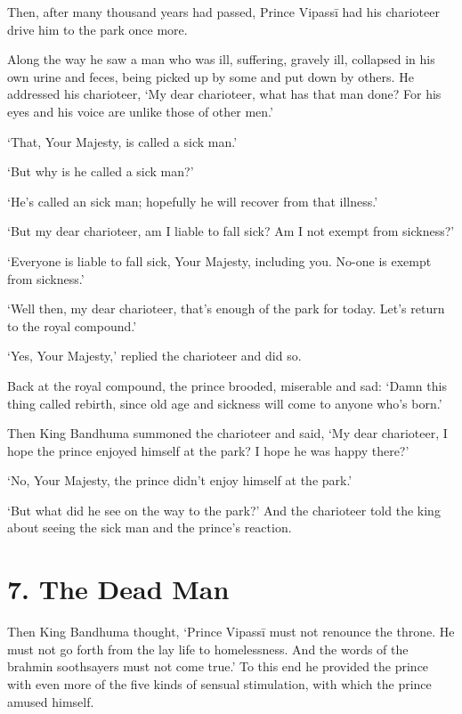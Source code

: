 \documentclass[12pt,openany]{book}%
\begin{document}
Then, after many thousand years had passed, Prince \textsanskrit{Vipassī} had his charioteer drive him to the park once more. 

Along the way he saw a man who was ill, suffering, gravely ill, collapsed in his own urine and feces, being picked up by some and put down by others. He addressed his charioteer, ‘My dear charioteer, what has that man done? For his eyes and his voice are unlike those of other men.’ 

‘That, Your Majesty, is called a sick man.’ 

‘But why is he called a sick man?’ 

‘He’s called an sick man; hopefully he will recover from that illness.’ 

‘But my dear charioteer, am I liable to fall sick? Am I not exempt from sickness?’ 

‘Everyone is liable to fall sick, Your Majesty, including you. No-one is exempt from sickness.’ 

‘Well then, my dear charioteer, that’s enough of the park for today. Let’s return to the royal compound.’ 

‘Yes, Your Majesty,’ replied the charioteer and did so. 

Back at the royal compound, the prince brooded, miserable and sad: ‘Damn this thing called rebirth, since old age and sickness will come to anyone who’s born.’ 

Then King Bandhuma summoned the charioteer and said, ‘My dear charioteer, I hope the prince enjoyed himself at the park? I hope he was happy there?’ 

‘No, Your Majesty, the prince didn’t enjoy himself at the park.’ 

‘But what did he see on the way to the park?’ And the charioteer told the king about seeing the sick man and the prince’s reaction. 

\section*{7. The Dead Man }

Then King Bandhuma thought, ‘Prince \textsanskrit{Vipassī} must not renounce the throne. He must not go forth from the lay life to homelessness. And the words of the brahmin soothsayers must not come true.’ To this end he provided the prince with even more of the five kinds of sensual stimulation, with which the prince amused himself. 
\end{document}
